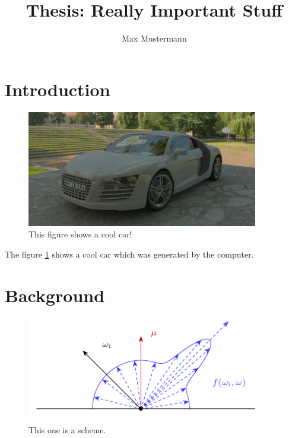 \documentclass[a4paper]{article}
\title{Thesis: Really Important Stuff}
\author{Max Mustermann}
\begin{document}
  \maketitle

  

  \tableofcontents
  \cleardoublepage
  \listoffigures

  \cleardoublepage

  

  \section{Introduction}
    \begin{figure}[H]
      \center
      \includegraphics[width=0.9\textwidth]{example-audi_r8-pt.png}
      \caption[Audi Car]{This figure shows a cool car!}
      \label{fig:audi}
    \end{figure}

    The figure \ref{fig:audi} shows a cool car which was generated by the computer.

  \section{Background}
    \begin{figure}[H]
      \center
      \includegraphics[width=0.9\textwidth]{brdf_1.pdf}
      \caption{This one is a scheme.}
      \label{fig:brdf}
    \end{figure}
\end{document}
